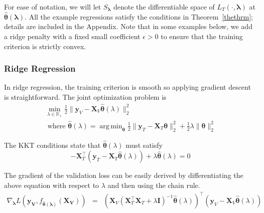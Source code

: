 \documentclass[12pt,letterpaper]{article}
\DeclareMathOperator*{\argmin}{arg\,min}
\begin{document}
For ease of notation, we will let $S_{\boldsymbol{\lambda}}$ denote the differentiable space of $L_T(\cdot, \boldsymbol{\lambda})$ at $\hat{\boldsymbol{\theta}}(\boldsymbol{\lambda})$. All the example regressions satisfy the conditions in Theorem~\ref{thethrm}; details are included in the Appendix. Note that in some examples below, we add a ridge penalty with a fixed small coefficient $\epsilon > 0$ to ensure that the training criterion is strictly convex.

\subsubsection{Ridge Regression}

In ridge regression, the training criterion is smooth so applying gradient descent is straightforward. The joint optimization problem is
\begin{equation}
\begin{array}{c}
\min_{\lambda\in \mathbb{R}_{+}} \frac{1}{2} \| \boldsymbol{y}_V - \boldsymbol{X}_V \hat{\boldsymbol{\theta}} (\lambda) \|_2 ^2 \\
\text{  where  } \hat{\boldsymbol{\theta}} (\lambda) = \argmin_{\boldsymbol{\theta}} \frac{1}{2} \| \boldsymbol{y}_T - \boldsymbol{X}_T \boldsymbol{\theta} \|_2 ^2 + \frac{1}{2} \lambda \| \boldsymbol{\theta} \|_2^2
\end{array}
\end{equation}

The KKT conditions state that $\hat{\boldsymbol{\theta}}(\lambda)$ must satisfy
\begin{equation}
-\boldsymbol{X}_T^\top (\boldsymbol{y}_T - \boldsymbol{X}_T \hat{\boldsymbol{\theta}} (\lambda)) + \lambda \hat{\boldsymbol{\theta}} (\lambda) = 0
\end{equation}

The gradient of the validation loss can be easily derived by differentiating the above equation with respect to $\lambda$ and then using the chain rule.
\begin{equation}
\begin{array} {lcl}
\nabla_{\boldsymbol \lambda} L(\boldsymbol{y_V}, f_{\hat {\boldsymbol \theta}(\boldsymbol \lambda)}(\boldsymbol{X_V}))
&=& (\boldsymbol{X}_V(\boldsymbol{X}_T^\top \boldsymbol{X}_T + \lambda \boldsymbol{I})^{-1}
\hat{\boldsymbol{\theta}}(\lambda))^{\top}
(\boldsymbol{y}_V - \boldsymbol{X}_V \hat{\boldsymbol{\theta}}(\lambda))
\end{array}
\end{equation}
\end{document}
